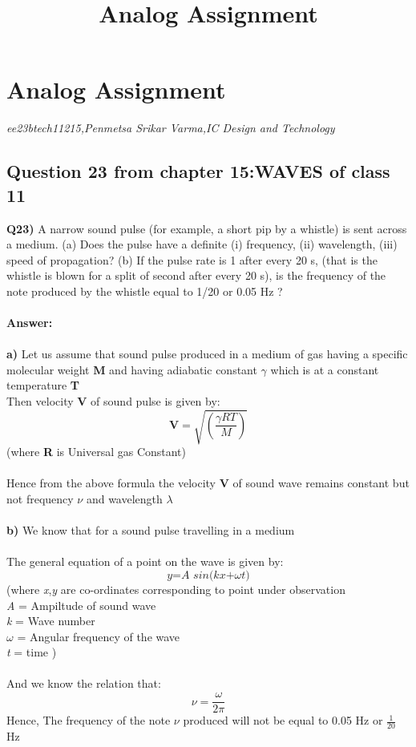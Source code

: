 \documentclass{article}
\title{Analog Assignment}
\begin{document}
\section*{Analog Assignment}
\textit{ee23btech11215,Penmetsa Srikar Varma,IC Design and Technology}
\subsection*{Question 23 from chapter 15:WAVES of class 11}
\textbf{Q23)}  A narrow sound pulse (for example, a short pip by a whistle) is sent across a
medium. (a) Does the pulse have a definite (i) frequency, (ii) wavelength, (iii) speed
of propagation? (b) If the pulse rate is 1 after every 20 s, (that is the whistle is
blown for a split of second after every 20 s), is the frequency of the note produced
by the whistle equal to 1/20 or 0.05 Hz ?\\
\\ \textbf{Answer:}\\\\
\textbf{a)} Let us assume that sound pulse produced in a medium of gas having a specific molecular weight \textbf{M} and having adiabatic constant $\gamma$ which is at a constant temperature \textbf{T}\\
Then velocity \textbf{V} of sound pulse is given by:\\
$$\textbf{V}=\sqrt{\left(\frac{\gamma RT}{M}\right)}$$ (where \textbf{R} is Universal gas Constant)\\
\\Hence from the above formula the velocity \textbf{V} of sound wave remains constant but not frequency \textbf{$\nu$} and wavelength \textbf{$\lambda$}\\\\
\textbf{b)} We know that for a sound pulse travelling in a medium\\\\
The general equation of a point on the wave is given by:\\
$$\textit{y=A sin(kx+$\omega$t)}$$(where \textit{x},\textit{y} are co-ordinates corresponding to point under observation\\
\textit{A} = Ampiltude of sound wave\\ 
\textit{k} = Wave number\\
$\omega$ = Angular frequency of the wave\\
\textit{t} = time
)\\\\
And we know the relation that:
$$\nu = \frac{\omega}{2\pi}$$
Hence, The frequency of the note $\nu$ produced will not be equal to 0.05 Hz or $\frac{1}{20}$ Hz 
\end{document}
